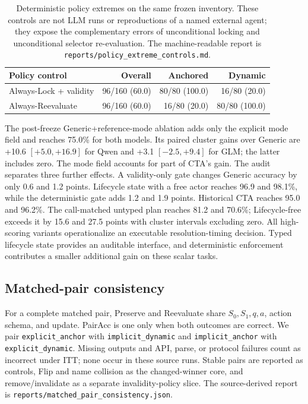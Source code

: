 \documentclass[10pt]{article}
\begin{document}
\begin{table}[h]
\centering
\small
\begin{tabular}{lrrr}
\toprule
Policy control & Overall & Anchored & Dynamic \\
\midrule
Always-Lock + validity & 96/160 (60.0) & 80/80 (100.0) & 16/80 (20.0) \\
Always-Reevaluate & 96/160 (60.0) & 16/80 (20.0) & 80/80 (100.0) \\
\bottomrule
\end{tabular}
\caption{Deterministic policy extremes on the same frozen inventory. These controls are not
LLM runs or reproductions of a named external agent; they expose the complementary errors of
unconditional locking and unconditional selector re-evaluation. The machine-readable report
is \texttt{reports/policy\_extreme\_controls.md}.}
\end{table}

The post-freeze Generic+reference-mode ablation adds only the explicit mode field and reaches
75.0\% for both models. Its paired cluster gains over Generic are +10.6
$[+5.0,+16.9]$ for Qwen and +3.1 $[-2.5,+9.4]$ for GLM; the latter includes zero. The
mode field accounts for part of CTA's gain. The audit separates three further effects. A validity-only gate changes Generic accuracy by only
0.6 and 1.2 points. Lifecycle state with a free actor reaches 96.9 and 98.1\%, while the
deterministic gate adds 1.2 and 1.9 points. Historical CTA reaches 95.0 and 96.2\%.
The call-matched untyped plan reaches 81.2 and 70.6\%; Lifecycle-free exceeds it by 15.6 and
27.5 points with cluster intervals excluding zero. All high-scoring variants operationalize an
executable resolution-timing decision. Typed lifecycle state provides an auditable interface, and
deterministic enforcement contributes a smaller additional gain on these scalar tasks.

\subsection{Matched-pair consistency}
For a complete matched pair, Preserve and Reevaluate share $S_0,S_1,q,a$, action schema, and
update. PairAcc is one only when both outcomes are correct. We pair
\texttt{explicit\_anchor} with \texttt{implicit\_dynamic} and
\texttt{implicit\_anchor} with \texttt{explicit\_dynamic}. Missing outputs and API, parse, or
protocol failures count as incorrect under ITT; none occur in these source runs. Stable pairs are
reported as controls, Flip and name collision as the changed-winner core, and remove/invalidate
as a separate invalidity-policy slice. The source-derived report is
\texttt{reports/matched\_pair\_consistency.json}.
\end{document}
